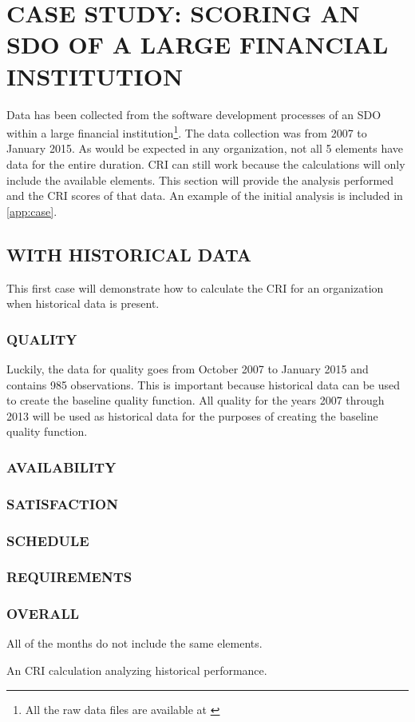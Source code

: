 \documentclass[SDSUThesis.tex]{subfiles}
\begin{document}
\section{CASE STUDY: SCORING AN SDO OF A LARGE FINANCIAL INSTITUTION}

Data has been collected from the software development processes of
an SDO within a large financial institution\footnote{All the raw data files are available at \cite{Swanstrom2015}}.
The data collection was from 2007 to January 2015. As would be expected
in any organization, not all 5 elements have data for the entire duration.
CRI can still work because the calculations will only include
the available elements.  This section will provide the analysis performed and the CRI scores of that data.  An example of the initial analysis is included in \cref{app:case}.

\subsection{WITH HISTORICAL DATA}
    This first case will demonstrate how to calculate the CRI for an
    organization when historical data is present.  
    \subsubsection{QUALITY}
        Luckily, the data for quality goes from October 2007 to January 2015
        and contains 985 observations.
        This is important because historical data can be used to create the
        baseline quality function.  All quality for the years 2007 through 2013
        will be used as historical data for the purposes of creating
        the baseline quality function.  
    \subsubsection{AVAILABILITY}
    \subsubsection{SATISFACTION}
    \subsubsection{SCHEDULE}
    \subsubsection{REQUIREMENTS}
    \subsubsection{OVERALL}
        All of the months do not include the same elements.  

An CRI calculation analyzing historical performance.


\end{document}
